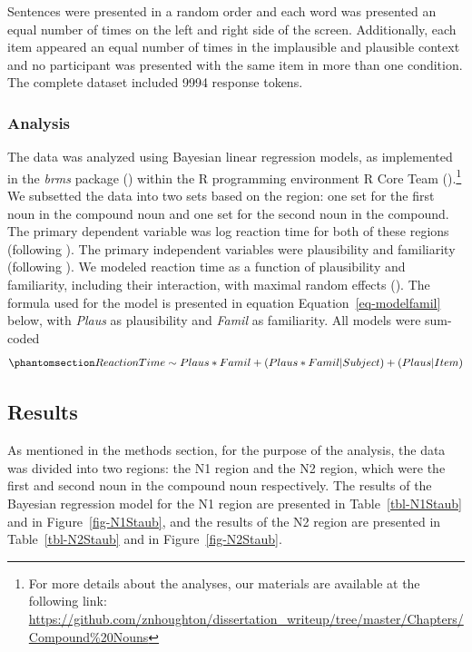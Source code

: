 \documentclass[
  12pt,
  letterpaper,
]{scrreprt}
\begin{document}
Sentences were presented in a random order and each word was presented
an equal number of times on the left and right side of the screen.
Additionally, each item appeared an equal number of times in the
implausible and plausible context and no participant was presented with
the same item in more than one condition. The complete dataset included
9994 response tokens.

\subsubsection{Analysis}\label{analysis}

The data was analyzed using Bayesian linear regression models, as
implemented in the \emph{brms} package
() within
the R programming environment R Core Team
().\footnote{For more details about the
  analyses, our materials are available at the following link:
  \url{https://github.com/znhoughton/dissertation_writeup/tree/master/Chapters/Compound\%20Nouns}}
We subsetted the data into two sets based on the region: one set for the
first noun in the compound noun and one set for the second noun in the
compound. The primary dependent variable was log reaction time for both
of these regions (following ). The primary independent variables were plausibility and
familiarity (following
). We
modeled reaction time as a function of plausibility and familiarity,
including their interaction, with maximal random effects
(). The
formula used for the model is presented in equation
Equation~\ref{eq-modelfamil} below, with \emph{Plaus} as plausibility
and \emph{Famil} as familiarity. All models were sum-coded
\begin{equation}\phantomsection\label{eq-modelfamil}{
Reaction Time \sim Plaus*Famil+(Plaus*Famil|Subject)+(Plaus|Item)
}\end{equation}

\subsection{Results}\label{results}

As mentioned in the methods section, for the purpose of the analysis,
the data was divided into two regions: the N1 region and the N2 region,
which were the first and second noun in the compound noun respectively.
The results of the Bayesian regression model for the N1 region are
presented in Table~\ref{tbl-N1Staub} and in Figure~\ref{fig-N1Staub},
and the results of the N2 region are presented in
Table~\ref{tbl-N2Staub} and in Figure~\ref{fig-N2Staub}.
\end{document}
